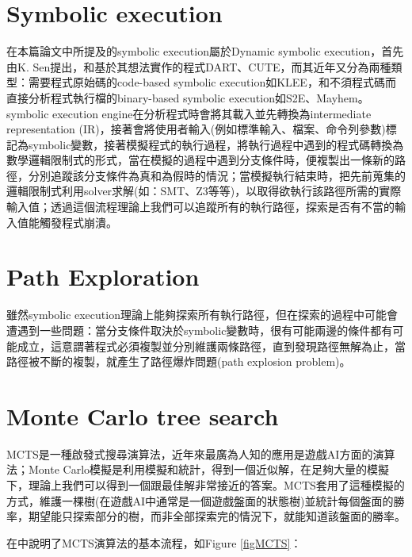 \documentclass[12pt,a4paper,oneside]{book}
\begin{document}
\section{Symbolic execution}

在本篇論文中所提及的symbolic execution屬於Dynamic symbolic execution，首先由K. Sen\cite{sen2007concolic}提出，和基於其想法實作的程式DART\cite{godefroid2005dart}、CUTE\cite{sen2005cute}，而其近年又分為兩種類型：需要程式原始碼的code-based symbolic execution如KLEE\cite{cadar2008klee}，和不須程式碼而直接分析程式執行檔的binary-based symbolic execution如S2E\cite{chipounov2012s2e}、Mayhem\cite{cha2012mayhem}。symbolic execution engine在分析程式時會將其載入並先轉換為intermediate representation (IR)，接著會將使用者輸入(例如標準輸入、檔案、命令列參數)標記為symbolic變數，接著模擬程式的執行過程，將執行過程中遇到的程式碼轉換為數學邏輯限制式的形式，當在模擬的過程中遇到分支條件時，便複製出一條新的路徑，分別追蹤該分支條件為真和為假時的情況；當模擬執行結束時，把先前蒐集的邏輯限制式利用solver求解(如：SMT\cite{vanegue2012smt}、Z3\cite{Z3}等等)，以取得欲執行該路徑所需的實際輸入值；透過這個流程理論上我們可以追蹤所有的執行路徑，探索是否有不當的輸入值能觸發程式崩潰。

\section{Path Exploration}

雖然symbolic execution理論上能夠探索所有執行路徑，但在探索的過程中可能會遭遇到一些問題：當分支條件取決於symbolic變數時，很有可能兩邊的條件都有可能成立，這意謂著程式必須複製並分別維護兩條路徑，直到發現路徑無解為止，當路徑被不斷的複製，就產生了路徑爆炸問題(path explosion problem)。

\section{Monte Carlo tree search}

MCTS是一種啟發式搜尋演算法，近年來最廣為人知的應用是遊戲AI方面的演算法；Monte Carlo模擬是利用模擬和統計，得到一個近似解，在足夠大量的模擬下，理論上我們可以得到一個跟最佳解非常接近的答案。MCTS套用了這種模擬的方式，維護一棵樹(在遊戲AI中通常是一個遊戲盤面的狀態樹)並統計每個盤面的勝率，期望能只探索部分的樹，而非全部探索完的情況下，就能知道該盤面的勝率。

在\cite{browne2012surveyMCTS}中說明了MCTS演算法的基本流程，如Figure \ref{figMCTS}：
\end{document}
